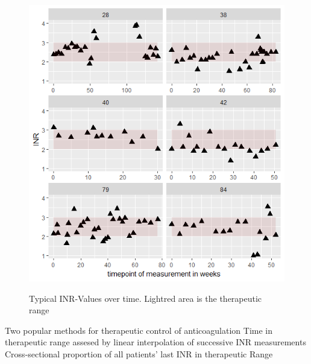 \begin{figure}
	\centering
	\includegraphics{./images/inr_panel.png}
	\label{inr_panel}
	\caption{Typical INR-Values over time. Lightred area is the therapeutic range}
\end{figure}

    
Two popular methods for therapeutic control of anticoagulation 
Time in therapeutic range assesed by linear interpolation of successive INR measurements
Cross-sectional proportion of all patients' last INR in therapeutic Range
